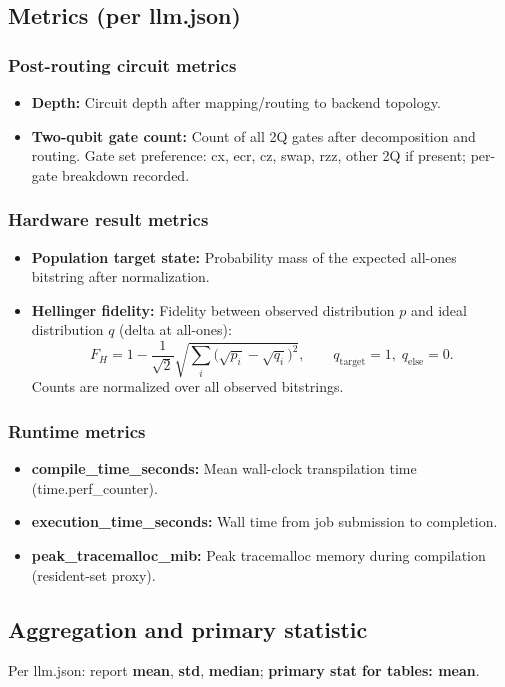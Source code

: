 \documentclass[11pt,a4paper]{article}
\begin{document}
\subsection{Metrics (per llm.json)}

\subsubsection{Post-routing circuit metrics}
\begin{itemize}
  \item \textbf{Depth:} Circuit depth after mapping/routing to backend topology.
  \item \textbf{Two-qubit gate count:} Count of all 2Q gates after decomposition and routing. Gate set preference: cx, ecr, cz, swap, rzz, other 2Q if present; per-gate breakdown recorded.
\end{itemize}

\subsubsection{Hardware result metrics}
\begin{itemize}
  \item \textbf{Population target state:} Probability mass of the expected all-ones bitstring after normalization.
  \item \textbf{Hellinger fidelity:} Fidelity between observed distribution \(p\) and ideal distribution \(q\) (delta at all-ones):
  \[
  F_H = 1 - \frac{1}{\sqrt{2}} \sqrt{\sum_i \bigl(\sqrt{p_i} - \sqrt{q_i}\bigr)^2},\qquad q_{\mathrm{target}}=1,\; q_{\mathrm{else}}=0.
  \]
  Counts are normalized over all observed bitstrings.
\end{itemize}

\subsubsection{Runtime metrics}
\begin{itemize}
  \item \textbf{compile\_time\_seconds:} Mean wall-clock transpilation time (time.perf\_counter).
  \item \textbf{execution\_time\_seconds:} Wall time from job submission to completion.
  \item \textbf{peak\_tracemalloc\_mib:} Peak tracemalloc memory during compilation (resident-set proxy).
\end{itemize}

\subsection{Aggregation and primary statistic}
Per llm.json: report \textbf{mean}, \textbf{std}, \textbf{median}; \textbf{primary stat for tables: mean}.
\end{document}
